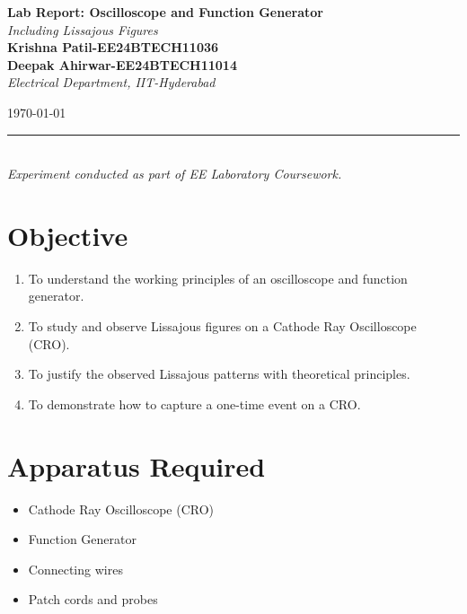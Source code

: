 \documentclass[a4paper,12pt]{article}
\newcommand{\myheader}{
    \noindent\rule{\textwidth}{1pt}\\[0.4cm]
}
\begin{document}
\begin{titlepage}
    \centering
    
    
    \vspace*{2cm}
    
    {\Huge \bfseries \textcolor{myblue}{Lab Report: Oscilloscope and Function Generator}}\\[0.5cm]
    {\LARGE \textit{\textcolor{myred}{Including Lissajous Figures}}}\\[1.5cm]
    
    \noindent
    \textbf{\Huge Krishna Patil-EE24BTECH11036}\\[0.3cm]
    \textbf{\Huge Deepak Ahirwar-EE24BTECH11014}\\[1.5cm]
    
    {\LARGE \textit{Electrical Department, IIT-Hyderabad}}\\[2cm]
    
    \vfill
    
    {\LARGE \today}
    
    \vfill
    \myheader
    \centering
    \textcolor{mygold}{\Large \textit{Experiment conducted as part of EE Laboratory Coursework.}}

    
\end{titlepage}

\newpage

\section*{\color{myblue}Objective}
\begin{enumerate}
    \item To understand the working principles of an oscilloscope and function generator.
    \item To study and observe Lissajous figures on a Cathode Ray Oscilloscope (CRO).
    \item To justify the observed Lissajous patterns with theoretical principles.
    \item To demonstrate how to capture a one-time event on a CRO.
\end{enumerate}

\section*{\color{myblue}Apparatus Required}
\begin{itemize}
    \item Cathode Ray Oscilloscope (CRO)
    \item Function Generator
    \item Connecting wires
    \item Patch cords and probes
\end{itemize}
\end{document}
